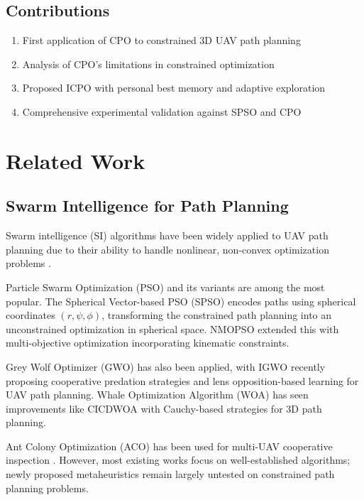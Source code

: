 \documentclass[12pt,a4paper]{article}
\begin{document}
\subsection{Contributions}
\begin{enumerate}
    \item First application of CPO to constrained 3D UAV path planning
    \item Analysis of CPO's limitations in constrained optimization
    \item Proposed ICPO with personal best memory and adaptive exploration
    \item Comprehensive experimental validation against SPSO and CPO
\end{enumerate}

\section{Related Work}

\subsection{Swarm Intelligence for Path Planning}
Swarm intelligence (SI) algorithms have been widely applied to UAV path planning 
due to their ability to handle nonlinear, non-convex optimization problems 
\cite{karaboga2012}.

Particle Swarm Optimization (PSO) \cite{kennedy1995} and its variants are 
among the most popular. The Spherical Vector-based PSO (SPSO) \cite{spsp} 
encodes paths using spherical coordinates $(r, \psi, \phi)$, transforming 
the constrained path planning into an unconstrained optimization in 
spherical space. NMOPSO \cite{nmopso} extended this with multi-objective 
optimization incorporating kinematic constraints.

Grey Wolf Optimizer (GWO) \cite{mirjalili2014} has also been applied, 
with IGWO \cite{igwo} recently proposing cooperative predation strategies 
and lens opposition-based learning for UAV path planning. Whale Optimization 
Algorithm (WOA) \cite{mirjalili2016} has seen improvements like CICDWOA 
\cite{cicdwoa} with Cauchy-based strategies for 3D path planning.

Ant Colony Optimization (ACO) \cite{dorigo2006} has been used for multi-UAV 
cooperative inspection \cite{aco3d}. However, most existing works focus on 
well-established algorithms; newly proposed metaheuristics remain largely 
untested on constrained path planning problems.
\end{document}
